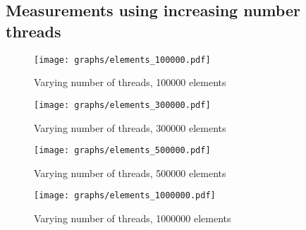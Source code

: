 \documentclass[a4paper]{article}
\begin{document}
\begin{thebibliography}{}
\pagebreak

\section{Measurements using increasing number threads}
\label{app:vary_nthreads}

\begin{figure}[H]
    \texttt{[image: graphs/elements\_100000.pdf]}
    \caption{Varying number of threads, 100000 elements}
    \label{fig:elements_100000}
\end{figure}
\begin{figure}[H]
    \texttt{[image: graphs/elements\_300000.pdf]}
    \caption{Varying number of threads, 300000 elements}
    \label{fig:elements_300000}
\end{figure}
\begin{figure}[H]
    \texttt{[image: graphs/elements\_500000.pdf]}
    \caption{Varying number of threads, 500000 elements}
    \label{fig:elements_500000}
\end{figure}
\begin{figure}[H]
    \texttt{[image: graphs/elements\_1000000.pdf]}
    \caption{Varying number of threads, 1000000 elements}
    \label{fig:elements_1000000}
\end{figure}

\end{thebibliography}
\end{document}
